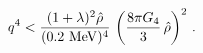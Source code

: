 \begin{equation}
q^4 < \frac{(1+\lambda)^2 \hat\rho}{(0.2\,\,{\rm MeV})^4}\,
\left(\frac{8 \pi G_4}{3}\,\hat\rho\right)^2\,.
\label{upper}\end{equation}

